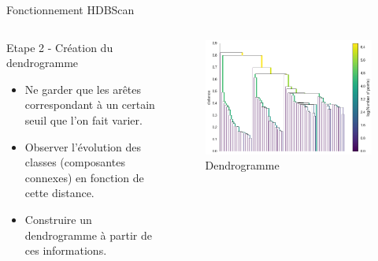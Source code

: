 \begin{frame}{Fonctionnement HDBScan }
    \begin{columns}
        \begin{column}{0.55\textwidth}
            \begin{block}{Etape 2 - Création du dendrogramme}
                \begin{itemize}
                    \item Ne garder que les arêtes correspondant à un certain seuil que l'on fait varier.
                    \item Observer l'évolution des classes (composantes connexes) en fonction de cette distance.
                    \item Construire un dendrogramme à partir de ces informations.
                \end{itemize}
            \end{block}
        \end{column}
        \begin{column}{0.45\textwidth}
            \begin{figure}
                \includegraphics[height=0.4\paperheight]{images/Illustration-HDBScan-3.png}
                \caption{\label{fig:ill_HDBScan_3} Dendrogramme}
            \end{figure}
        \end{column}
    \end{columns}
\end{frame}

